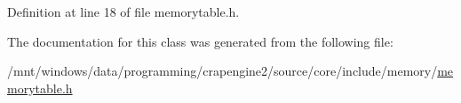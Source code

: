 Definition at line 18 of file memorytable.\+h.



The documentation for this class was generated from the following file\+:\begin{DoxyCompactItemize}
\item 
/mnt/windows/data/programming/crapengine2/source/core/include/memory/\hyperlink{memorytable_8h}{memorytable.\+h}\end{DoxyCompactItemize}
